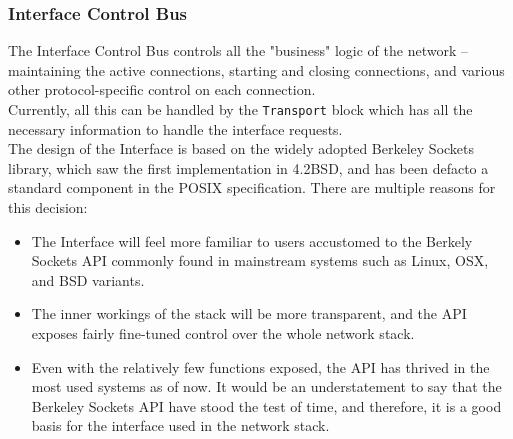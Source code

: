 \subsubsection{Interface Control Bus}
The Interface Control Bus controls all the "business" logic of the network -- 
maintaining the active connections, starting and closing connections, and various
other protocol-specific control on each connection.\\ 
Currently, all this can be handled by the \texttt{Transport} block which has all 
the necessary information to handle the interface requests.\\
The design of the Interface is based on the widely adopted Berkeley Sockets library,
which saw the first implementation in 4.2BSD, and has been defacto a standard 
component in the POSIX specification\cite{tcpip_illustrated_vol2}. There are 
multiple reasons for this decision:
\begin{itemize}
\item The Interface will feel more familiar to users accustomed to the Berkely 
Sockets API commonly found in mainstream systems such as Linux, OSX, and BSD 
variants.

\item The inner workings of the stack will be more transparent, and the API 
exposes fairly fine-tuned control over the whole network stack.

\item Even with the relatively few functions exposed, the API
has thrived in the most used systems as of now. It would be an understatement to 
say that the Berkeley Sockets API have stood the test of time, and therefore, it
is a good basis for the interface used in the network stack.

\end{itemize}

